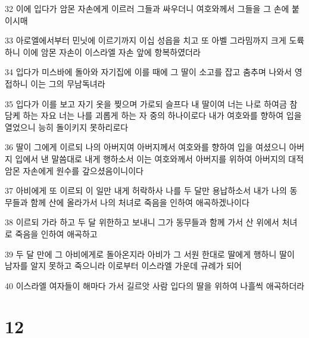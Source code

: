 \par 32 이에 입다가 암몬 자손에게 이르러 그들과 싸우더니 여호와께서 그들을 그 손에 붙이시매
\par 33 아로엘에서부터 민닛에 이르기까지 이십 성읍을 치고 또 아벨 그라밈까지 크게 도륙하니 이에 암몬 자손이 이스라엘 자손 앞에 항복하였더라
\par 34 입다가 미스바에 돌아와 자기집에 이를 때에 그 딸이 소고를 잡고 춤추며 나와서 영접하니 이는 그의 무남독녀라
\par 35 입다가 이를 보고 자기 옷을 찢으며 가로되 슬프다 내 딸이여 너는 나로 하여금 참담케 하는 자요 너는 나를 괴롭게 하는 자 중의 하나이로다 내가 여호와를 향하여 입을 열었으니 능히 돌이키지 못하리로다
\par 36 딸이 그에게 이르되 나의 아버지여 아버지께서 여호와를 향하여 입을 여셨으니 아버지 입에서 낸 말씀대로 내게 행하소서 이는 여호와께서 아버지를 위하여 아버지의 대적 암몬 자손에게 원수를 갚으셨음이니이다
\par 37 아비에게 또 이르되 이 일만 내게 허락하사 나를 두 달만 용납하소서 내가 나의 동무들과 함께 산에 올라가서 나의 처녀로 죽음을 인하여 애곡하겠나이다
\par 38 이르되 가라 하고 두 달 위한하고 보내니 그가 동무들과 함께 가서 산 위에서 처녀로 죽음을 인하여 애곡하고
\par 39 두 달 만에 그 아비에게로 돌아온지라 아비가 그 서원 한대로 딸에게 행하니 딸이 남자를 알지 못하고 죽으니라 이로부터 이스라엘 가운데 규례가 되어
\par 40 이스라엘 여자들이 해마다 가서 길르앗 사람 입다의 딸을 위하여 나흘씩 애곡하더라

\chapter{12}

